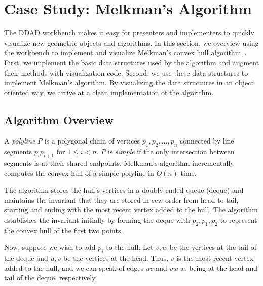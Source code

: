 
\FloatBarrier
\section{Case Study: Melkman's Algorithm}

The DDAD workbench makes it easy for presenters and implementers to quickly
visualize new geometric objects and algorithms. In this section, we overview
using the workbench to implement and visualize Melkman's convex hull
algorithm~\cite{melkman1987line}. First, we implement the basic data
structures used by the algorithm and augment their methods with visualization
code. Second, we use these data structures to implement Melkman's algorithm. 
By visualizing the data structures in an object oriented way, we arrive at a
clean implementation of the algorithm.



\subsection{Algorithm Overview}

A \emph{polyline} $P$ is a polygonal chain of vertices $p_1, p_2, \ldots, p_n$
connected by line segments $p_ip_{i+1}$ for $1 \leq i < n$. $P$ is \emph{simple}
if the only intersection between segments is at their shared endpoints.
Melkman's algorithm incrementally computes the convex hull of a simple polyline
in $O(n)$ time. 

The algorithm stores the hull's vertices in a doubly-ended queue (deque) and
maintains the invariant that they are stored in ccw order from head to tail,
starting and ending with the most recent vertex added to the hull. The algorithm
establishes the invariant initially by forming the deque with $p_2, p_1, p_2$ to
represent the convex hull of the first two points. 

Now, suppose we wish to add $p_i$ to the hull. Let $v, w$ be the vertices at the
tail of the deque and $u, v$ be the vertices at the head. Thus, $v$ is the most
recent vertex added to the hull, and we can speak of edges $uv$ and $vw$ as
being at the head and tail of the deque, respectively. 

